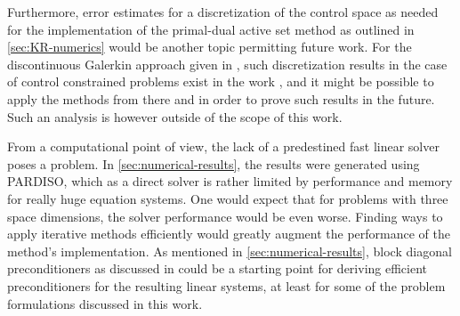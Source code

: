 \documentclass[../thesis.tex]{subfiles}
\begin{document}
Furthermore, error estimates for a discretization of the control space as needed for the implementation of the primal-dual active set method as outlined in \cref{sec:KR-numerics} would be another topic permitting future work.
For the discontinuous Galerkin approach given in \cite{MeidnerVexler-I}, such discretization results in the case of control constrained problems exist in the work \cite{MeidnerVexler-II}, and it might be possible to apply the methods from there and \cite{CasasTroeltzsch} in order to prove such results in the future. Such an analysis is however outside of the scope of this work.

From a computational point of view, the lack of a predestined fast linear solver poses a problem.
In \cref{sec:numerical-results}, the results were generated using PARDISO, which as a direct solver is rather limited by performance and memory for really huge equation systems.
One would expect that for problems with three space dimensions, the solver performance would be even worse.
Finding ways to apply iterative methods efficiently would greatly augment the performance of the method's implementation.
As mentioned in \cref{sec:numerical-results}, block diagonal preconditioners as discussed in \cite{BenziGolubLiesen} could be a starting point for deriving efficient preconditioners for the resulting linear systems, at least for some of the problem formulations discussed in this work.
\end{document}
